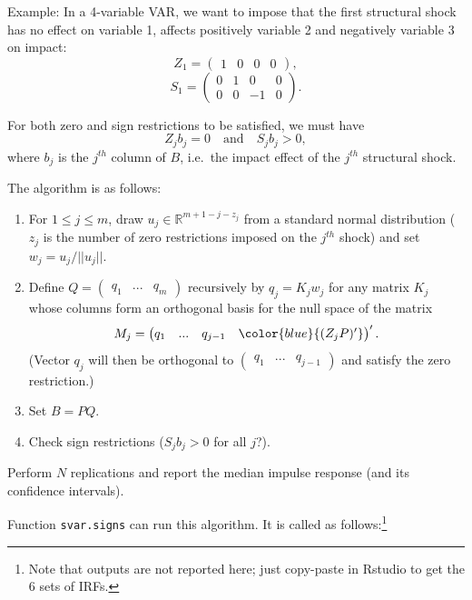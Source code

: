 \documentclass[
  12pt,
]{book}
\providecommand{\tightlist}{%
  \setlength{\itemsep}{0pt}\setlength{\parskip}{0pt}}
\theoremstyle{definition}
\theoremstyle{definition}
\theoremstyle{definition}
\theoremstyle{definition}
\theoremstyle{remark}
\begin{document}
Example: In a 4-variable VAR, we want to impose that the first structural shock has no effect on variable 1, affects positively variable 2 and negatively variable 3 on impact:
\[Z_1 = \begin{pmatrix}1 & 0 & 0 & 0\end{pmatrix}, \]
\[S_1 = \begin{pmatrix}0 & 1 & 0 & 0\\
0 & 0 & -1 & 0\end{pmatrix}. \]

For both zero and sign restrictions to be satisfied, we must have
\[
Z_jb_j=0 \quad \mbox{and} \quad S_jb_j>0,
\]
where \(b_j\) is the \(j^{th}\) column of \(B\), i.e.~the impact effect of the \(j^{th}\) structural shock.

The algorithm is as follows:

\begin{enumerate}
\def\labelenumi{\arabic{enumi}.}
\tightlist
\item
  For \(1\le j\le m\), draw \(u_j\in \mathbb{R}^{m+1-j-z_j}\) from a standard normal distribution (\(z_j\) is the number of zero restrictions imposed on the \(j^{th}\) shock) and set \(w_j = u_j/||u_j||\).
\item
  Define \(Q= \begin{pmatrix}q_1&...&q_m\end{pmatrix}\) recursively by \(q_j = K_jw_j\) for any matrix \(K_j\) whose columns form an orthogonal basis for the null space of the matrix \[M_j =
  \begin{pmatrix} q_1&...&q_{j-1}&\color{blue}{(Z_jP)'}\end{pmatrix}'.\] (Vector \(q_j\) will then be orthogonal to \(\begin{pmatrix} q_1&...&q_{j-1}\end{pmatrix}\) and satisfy the zero restriction.)
\item
  Set \(B=PQ\).
\item
  Check sign restrictions (\(S_jb_j>0\) for all \(j\)?).
\end{enumerate}

Perform \(N\) replications and report the median impulse response (and its confidence intervals).

Function \texttt{svar.signs} can run this algorithm. It is called as follows:\footnote{Note that outputs are not reported here; just copy-paste in Rstudio to get the 6 sets of IRFs.}
\end{document}
